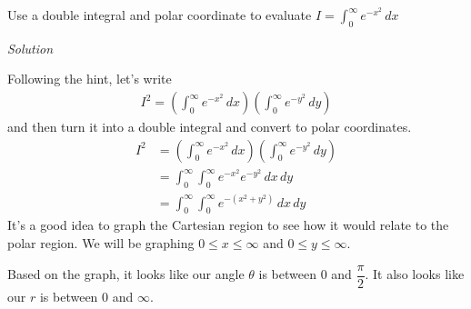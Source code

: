 \documentclass{article}
\newcommand{\lrp}[1]{\left( #1 \right)}
\newcommand{\Solution}{\textit{Solution}}
\begin{document}
Use a double integral and polar coordinate to evaluate $\displaystyle I=\int_0^{\infty}e^{-x^2}\,dx$

\Solution

Following the hint, let's write 
\begin{align*}
    I^2=\lrp{\int_0^\infty e^{-x^2}\,dx}\lrp{\int_0^{\infty}e^{-y^2}\,dy}
\end{align*}
and then turn it into a double integral and convert to polar coordinates.
\begin{align*}
     I^2&=\lrp{\int_0^\infty e^{-x^2}\,dx}\lrp{\int_0^{\infty}e^{-y^2}\,dy}\\
     &=\int_0^{\infty}\int_0^{\infty}e^{-x^2}e^{-y^2}\,dx\,dy\tag{ok to combine since they're not functions of each other}\\
     &=\int_0^{\infty}\int_0^{\infty}e^{-(x^2+y^2)}\,dx\,dy
\end{align*}
It's a good idea to graph the Cartesian region to see how it would relate to the polar region. We will be graphing $0\leq x \leq \infty$ and $0\leq y \leq \infty$.
\begin{center}
\end{center}
Based on the graph, it looks like our angle $\theta$ is between $0$ and $\dfrac{\pi}{2}$. It also looks like our $r$ is between $0$ and $\infty$.
\end{document}
